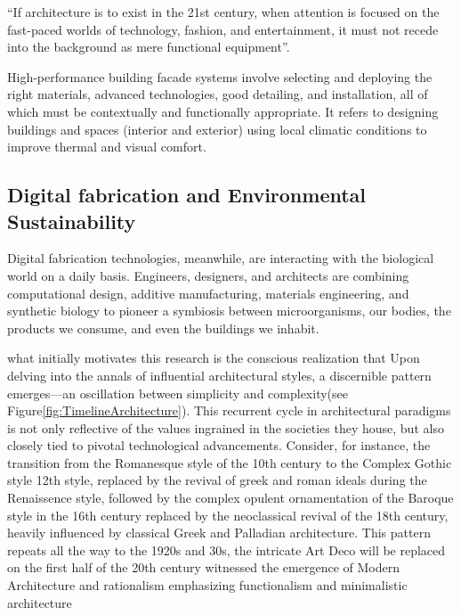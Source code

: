         ``If architecture is to exist in the 21st century, when attention is focused on the fast-paced worlds of technology, fashion, and entertainment, it must not recede into the background as mere functional equipment''\cite{Gage2015}.

        High-performance building facade systems involve selecting and deploying the right materials, advanced technologies, good detailing, and installation, all of which must be contextually and functionally appropriate.
        It refers to designing buildings and spaces (interior and exterior) using local climatic conditions to improve thermal and visual comfort.\cite{Kamaltech2020}



\subsection{Digital fabrication and Environmental Sustainability}
\label{subsec:DigitalFabricationAndEnvSustainability}
Digital fabrication technologies, meanwhile, are interacting with the biological world on a daily basis.
Engineers, designers, and architects are combining computational design, additive manufacturing, materials engineering, and synthetic biology to pioneer a symbiosis between microorganisms, our bodies, the products we consume, and even the buildings we inhabit\cite{Schwab2016}.



what initially motivates this research is the conscious realization that
Upon delving into the annals of influential architectural styles, a discernible pattern emerges—an oscillation between simplicity and complexity(see Figure\ref{fig:TimelineArchitecture}).
This recurrent cycle in architectural paradigms is not only reflective of the values ingrained in the societies they house, but also closely tied to pivotal technological advancements.
Consider, for instance, the transition from the Romanesque style of the 10th century to the Complex Gothic style 12th style, replaced by the revival of greek and roman ideals during the Renaissence style, followed by the complex opulent ornamentation of the Baroque style in the 16th century replaced by the neoclassical revival of the 18th century, heavily influenced by classical Greek and Palladian architecture\cite{Arora2023}.
This pattern repeats all the way to the 1920s and 30s, the intricate Art Deco will be replaced on the first half of the 20th century witnessed the emergence of Modern Architecture and rationalism emphasizing functionalism and minimalistic architecture




